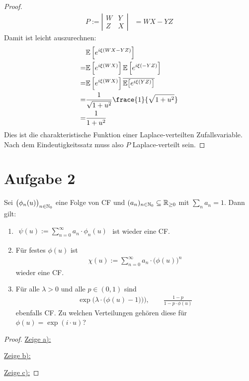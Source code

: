 \documentclass[12pt,a4paper]{article}
\begin{document}
\begin{proof}
	\begin{align*}
		P:=
		\left|\begin{array}{cc}
			W & Y \\
			Z & X
		\end{array}\right| &= WX-YZ
	\end{align*}
	Damit ist leicht auszurechnen:
	\begin{align*}
	 	&\E\left[e^{i\xi(WX-YZ)}\right]\\
	 	=&\E\left[e^{i\xi(WX)}\right]\E\left[e^{i\xi(-YZ)}\right]\\
	 	=&\E\left[e^{i\xi(WX)}\right]\overline{\E\big[e^{i\xi(YZ)}\big]}\\
		=&\frac{1}{\sqrt{1+u^2}}\frace{1}{\sqrt{1+u^2}}\\
		=&\frac{1}{1+u^2}
	\end{align*}
	Dies ist die charakteristische Funktion einer Laplace-verteilten Zufallsvariable.
	Nach dem Eindeutigkeitssatz muss also $P$ Laplace-verteilt sein.
	
\end{proof}

\section*{Aufgabe 2}
Sei $\big(\phi_n(u)\big)_{n\in\mathbb{N}_0}$ eine Folge von CF und $(a_n)_{n\in\mathbb{N}_0}\subseteq\mathbb{R}_{\geq0}$ mit $\sum\limits_n a_n=1$.
Dann gilt:
\begin{enumerate}[label=\alph*)]
	\item $\begin{aligned}
		\psi(u):=\sum\limits_{n=0}^\infty a_n\cdot\phi_n(u)
	\end{aligned}$ ist wieder eine CF.
	\item Für festes $\phi(u)$ ist 
	\begin{align*}
		\chi(u):=\sum\limits_{n=0}^\infty a_n\cdot\big(\phi(u)\big)^n
	\end{align*}
	wieder eine CF.
	\item Für alle $\lambda>0$ und alle $p\in(0,1)$ sind
	\begin{align*}
		\exp\Big(\lambda\cdot\big(\phi(u)-1)\big)\Big),\qquad
		\frac{1-p}{1-p\cdot\phi(u)}
	\end{align*}
	ebenfalls CF. Zu welchen Verteilungen gehören diese für $\phi(u)=\exp(i\cdot u)$?
\end{enumerate} 

\begin{proof}
	\underline{Zeige a):}
	
	\underline{Zeige b):}
	
	\underline{Zeige c):}
		
\end{proof}
\end{document}
